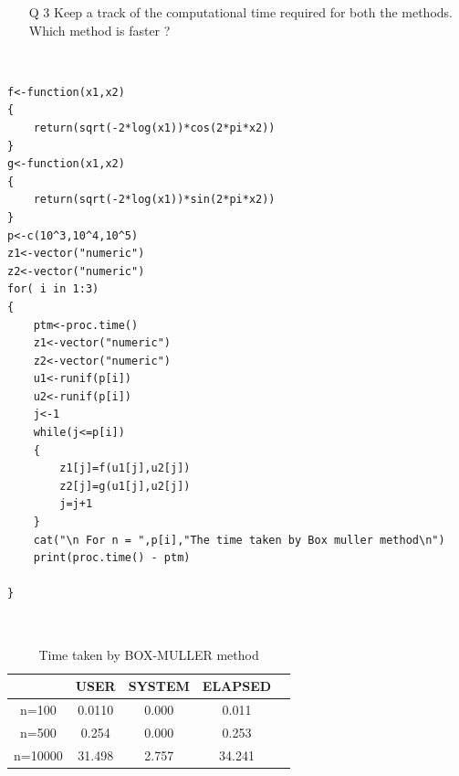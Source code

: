 \documentclass[12pt]{book}
\begin{document}
\begin{figure}[H]
	\centering
\end{figure}
\newpage
\begin{enumerate}
\item[Q 3] Keep a track of the computational time required for both the methods. Which method is faster ?
\end{enumerate}
\\
\begin{lstlisting}
f<-function(x1,x2)
{
	return(sqrt(-2*log(x1))*cos(2*pi*x2))
}
g<-function(x1,x2)
{
	return(sqrt(-2*log(x1))*sin(2*pi*x2))
}
p<-c(10^3,10^4,10^5)
z1<-vector("numeric")
z2<-vector("numeric")
for( i in 1:3)
{
	ptm<-proc.time()
	z1<-vector("numeric")
	z2<-vector("numeric")
	u1<-runif(p[i])
	u2<-runif(p[i])
	j<-1
	while(j<=p[i])
	{
		z1[j]=f(u1[j],u2[j])
		z2[j]=g(u1[j],u2[j])
		j=j+1
	}
	cat("\n For n = ",p[i],"The time taken by Box muller method\n")
	print(proc.time() - ptm)

}
\end{lstlisting}
\\
\begin{table}[h!]
\centering
\begin{tabular}{||c|c|c| c|c||}
\hline
&USER &SYSTEM&ELAPSED \\
[0.5ex]
\hline\hline
n=100&0.0110&0.000&0.011\\	
n=500&0.254&0.000&0.253\\
n=10000&31.498&2.757&34.241\\
[1ex]
\hline
\end{tabular}
\caption{Time taken by BOX-MULLER method}
\label{table:1}
\end{table}\\
\end{document}
